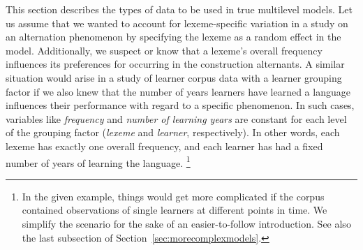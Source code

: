 \documentclass[a4paper,12pt]{article}
\begin{document}
This section describes the types of data to be used in true multilevel models.
Let us assume that we wanted to account for lexeme-specific variation in a study on an alternation phenomenon by specifying the lexeme as a random effect in the model.
Additionally, we suspect or know that a lexeme's overall frequency influences its preferences for occurring in the construction alternants.
A similar situation would arise in a study of learner corpus data with a learner grouping factor if we also knew that the number of years learners have learned a language influences their performance with regard to a specific phenomenon.
In such cases, variables like \textit{frequency} and \textit{number of learning years} are constant for each level of the grouping factor (\textit{lexeme} and \textit{learner}, respectively).
In other words, each lexeme has exactly one overall frequency, and each learner has had a fixed number of years of learning the language.%
\footnote{In the given example, things would get more complicated if the corpus contained observations of single learners at different points in time.
We simplify the scenario for the sake of an easier-to-follow introduction.
See also the last subsection of Section~\ref{sec:morecomplexmodels}.}
\end{document}
